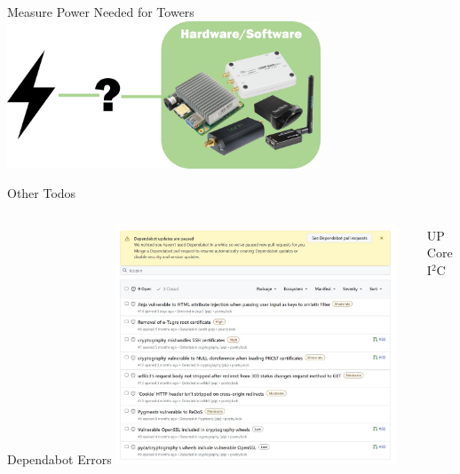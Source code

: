 \begin{frame}{Measure Power Needed for Towers}
    \centering
    \includegraphics[height=0.7\textheight,width=0.7\textwidth,keepaspectratio]{rtt-power-measure-graphic.png}
\end{frame}
\begin{frame}{Other Todos}
   \begin{columns}
       \begin{column}{0.5\textwidth}
           Dependabot Errors
           \includegraphics[height=0.7\textheight,width=0.7\textwidth,keepaspectratio]{rtt-dependabot.jpg}
       \end{column}
       \begin{column}{0.5\textwidth}
           UP Core I$^2$C
       \end{column}
   \end{columns}
\end{frame}